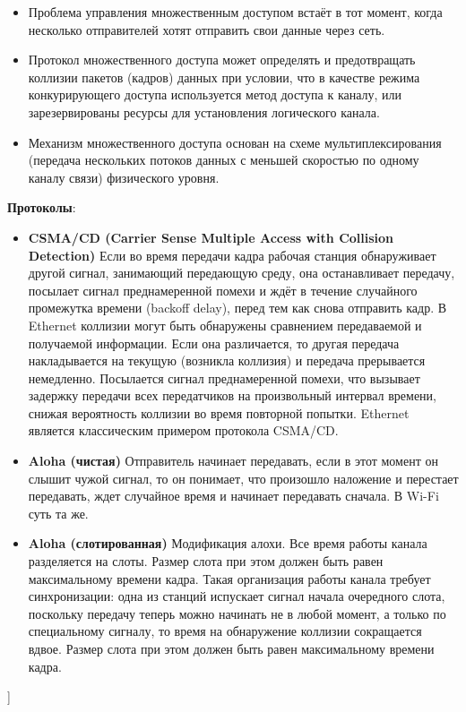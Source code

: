\begin{itemize}
    \item Проблема управления множественным доступом встаёт в тот момент, когда несколько отправителей хотят отправить свои данные через сеть.
    \item Протокол множественного доступа может определять и предотвращать коллизии пакетов (кадров) данных при условии, что в качестве режима конкурирующего доступа используется метод доступа к каналу, или зарезервированы ресурсы для установления логического канала.
    \item Механизм множественного доступа основан на схеме мультиплексирования (передача нескольких потоков данных с меньшей скоростью по одному каналу связи) физического уровня.
\end{itemize}
\textbf{Протоколы}:
\begin{itemize}
    \item \textbf{CSMA/CD (Carrier Sense Multiple Access with Collision Detection)}
    Если во время передачи кадра рабочая станция обнаруживает другой сигнал, занимающий передающую среду, она останавливает передачу, посылает сигнал преднамеренной помехи и ждёт в течение случайного промежутка времени (backoff delay), перед тем как снова отправить кадр.
    В Ethernet коллизии могут быть обнаружены сравнением передаваемой и получаемой информации. Если она различается, то другая передача накладывается на текущую (возникла коллизия) и передача прерывается немедленно. Посылается сигнал преднамеренной помехи, что вызывает задержку передачи всех передатчиков на произвольный интервал времени, снижая вероятность коллизии во время повторной попытки.
    Ethernet является классическим примером протокола CSMA/CD.
    \item \textbf{Aloha (чистая)}
    Отправитель начинает передавать, если в этот момент он слышит чужой сигнал, то он понимает, что произошло наложение и перестает передавать, ждет случайное время и начинает передавать сначала.
    В Wi-Fi суть та же.
    \item \textbf{Aloha (слотированная)}
    Модификация алохи. Все время работы канала разделяется на слоты. Размер слота при этом должен быть равен максимальному времени кадра. Такая организация работы канала требует синхронизации: одна из станций испускает сигнал начала очередного слота, поскольку передачу теперь можно начинать не в любой момент, а только по специальному сигналу, то время на обнаружение коллизии сокращается вдвое. Размер слота при этом должен быть равен максимальному времени кадра.
\end{itemize}

\bigbreak
[\cite[page 69-96]{smelbook2}]